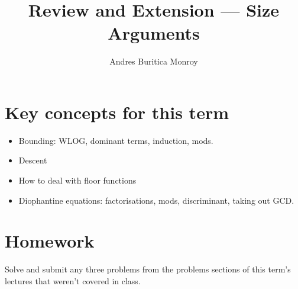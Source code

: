 \documentclass{article}
\title{Review and Extension --- Size Arguments}
\author{Andres Buritica Monroy}
\date{}
\begin{document}
\maketitle
\section{Key concepts for this term}
  \begin{itemize}
    \item Bounding: WLOG, dominant terms, induction, mods.
    \item Descent
    \item How to deal with floor functions
    \item Diophantine equations: factorisations, mods, discriminant, taking out
      GCD\@.
  \end{itemize}
\section{Homework}
Solve and submit any three problems from the problems sections of this term's
lectures that weren't covered in class.
\end{document}

